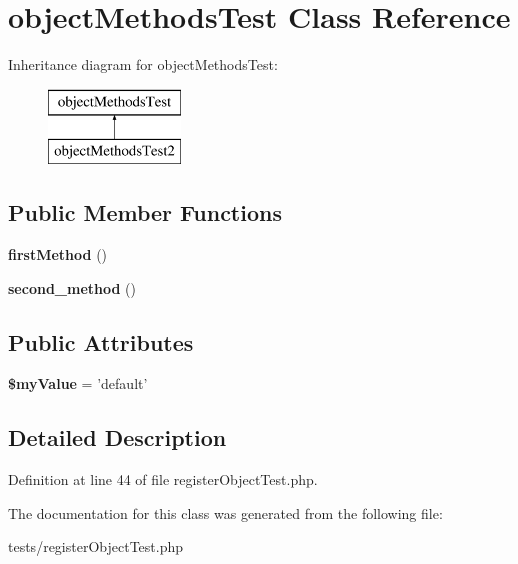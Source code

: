 \hypertarget{classobjectMethodsTest}{
\section{objectMethodsTest Class Reference}
\label{classobjectMethodsTest}
}
Inheritance diagram for objectMethodsTest:\begin{figure}[H]
\begin{center}
\leavevmode
\includegraphics[height=2.000000cm]{classobjectMethodsTest}
\end{center}
\end{figure}
\subsection*{Public Member Functions}
\begin{DoxyCompactItemize}
\item 
\hypertarget{classobjectMethodsTest_a9d65dc7bb710286fdb5cf7c83ea41221}{
{\bfseries firstMethod} ()}
\label{classobjectMethodsTest_a9d65dc7bb710286fdb5cf7c83ea41221}

\item 
\hypertarget{classobjectMethodsTest_a58bf5ac99ead82fcd39b0f29f20344e6}{
{\bfseries second\_\-method} ()}
\label{classobjectMethodsTest_a58bf5ac99ead82fcd39b0f29f20344e6}

\end{DoxyCompactItemize}
\subsection*{Public Attributes}
\begin{DoxyCompactItemize}
\item 
\hypertarget{classobjectMethodsTest_a54f9f14b351357e38163ec4583bd45f7}{
{\bfseries \$myValue} = 'default'}
\label{classobjectMethodsTest_a54f9f14b351357e38163ec4583bd45f7}

\end{DoxyCompactItemize}


\subsection{Detailed Description}


Definition at line 44 of file registerObjectTest.php.



The documentation for this class was generated from the following file:\begin{DoxyCompactItemize}
\item 
tests/registerObjectTest.php\end{DoxyCompactItemize}

